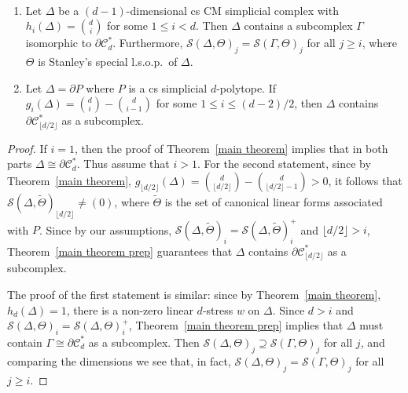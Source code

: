 \documentclass[ALCO,ThmDefs,Unicode,epreuves]{cedram}
\def\C{\mathcal{C}}
\newcommand{\Stress}{\mathcal{S}}
\begin{document}
\begin{coro} \ \samepage
\begin{enumerate}
\item Let $\Delta$ be a $(d-1)$-dimensional cs CM simplicial complex with $h_i(\Delta)=\binom{d}{i}$ for some $1\leq i <d$. Then $\Delta$ contains a subcomplex $\Gamma$ isomorphic to $\partial\C^*_d$. Furthermore, $\Stress(\Delta, \Theta)_j=\Stress(\Gamma, \Theta)_j$ for all $j\geq i$, where $\Theta$ is Stanley's special l.s.o.p.~of $\Delta$. 
\item Let $\Delta=\partial P$ where $P$ is a cs simplicial $d$-polytope. If $g_i(\Delta)=\binom{d}{i}-\binom{d}{i-1}$ for some $1\leq i \leq (d-2)/2$, then $\Delta$ contains $\partial\C^*_{\lfloor d/2\rfloor}$ as a subcomplex. 
\end{enumerate}
\end{coro}
\begin{proof}
	If $i=1$, then the proof of Theorem~\ref{main theorem} implies that in both parts $\Delta\cong\partial\C^*_d$. Thus assume that $i>1$. For the second statement, since by Theorem~\ref{main theorem},	$g_{\lfloor d/2\rfloor}(\Delta)=\binom{d}{\lfloor d/2\rfloor}-\binom{d}{\lfloor d/2\rfloor-1}>0$, it follows that $\Stress(\Delta, \widetilde{\Theta})_{\lfloor d/2\rfloor}\neq (0)$, where $\widetilde{\Theta}$ is the set of canonical linear forms associated with $P$. Since by our assumptions, $\Stress(\Delta,\widetilde{\Theta})_i=\Stress(\Delta,\widetilde{\Theta})^+_i$ and $\lfloor d/2\rfloor >i$, Theorem~\ref{main theorem prep} guarantees that $\Delta$ contains $\partial\C^*_{\lfloor d/2\rfloor}$ as a subcomplex.

	
The proof of the first statement is similar: since by Theorem~\ref{main theorem}, $h_d(\Delta)=1$, there is a non-zero linear $d$-stress $w$ on $\Delta$. Since $d>i$ and $\Stress(\Delta,\Theta)_i=\Stress(\Delta,\Theta)^+_i$, Theorem~\ref{main theorem prep} implies that $\Delta$ must contain $\Gamma\cong\partial\C^*_d$ as a subcomplex. Then $\Stress(\Delta, \Theta)_j\supseteq\Stress(\Gamma, \Theta)_j$ for all $j$, and comparing the dimensions we see that, in fact, $\Stress(\Delta, \Theta)_j=\Stress(\Gamma,\Theta)_j$ for all $j\geq i$.
\end{proof}




	
	
\end{document}

